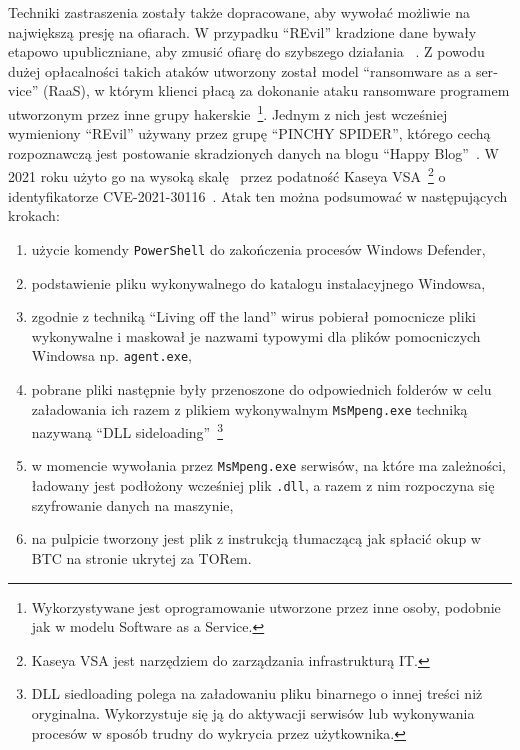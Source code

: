Techniki zastraszenia zostały także dopracowane, aby wywołać możliwie na największą presję na ofiarach. W przypadku \foreignquote{english}{REvil} kradzione dane bywały etapowo upubliczniane, aby zmusić ofiarę do szybszego działania ~\cite{hern_ransomware_2021}.\newline
Z powodu dużej opłacalności takich ataków utworzony został model \foreignquote{english}{ransomware as a service} (RaaS), w którym klienci płacą za dokonanie ataku ransomware programem utworzonym przez inne grupy hakerskie~\footnote{Wykorzystywane jest oprogramowanie utworzone przez inne osoby, podobnie jak w modelu Software as a Service.}. 
\newline
Jednym z nich jest wcześniej wymieniony \foreignquote{english}{REvil} używany przez grupę \foreignquote{english}{PINCHY SPIDER}, którego cechą rozpoznawczą jest postowanie skradzionych danych na blogu \foreignquote{english}{Happy Blog}~\cite{hern_ransomware_2021}. W 2021 roku użyto go na wysoką skalę~\cite{mcmillan_ransomware_2021} przez podatność Kaseya VSA~\footnote{Kaseya VSA jest narzędziem do zarządzania infrastrukturą IT.} o identyfikatorze CVE-2021-30116~\cite{kasaya}. Atak ten można podsumować w następujących krokach:
\begin{enumerate}
    \item użycie komendy \texttt{PowerShell} do zakończenia procesów Windows Defender,
    \item podstawienie pliku wykonywalnego do katalogu instalacyjnego Windowsa,
    \item zgodnie z techniką \foreignquote{english}{Living off the land} wirus pobierał pomocnicze pliki wykonywalne i maskował je nazwami typowymi dla plików pomocniczych Windowsa np. \texttt{agent.exe},
    \item pobrane pliki następnie były przenoszone do odpowiednich folderów w celu załadowania ich razem z plikiem wykonywalnym \texttt{MsMpeng.exe} techniką nazywaną \foreignquote{english}{DLL sideloading}~\footnote{DLL siedloading polega na załadowaniu pliku binarnego o innej treści niż oryginalna. Wykorzystuje się ją do aktywacji serwisów lub wykonywania procesów w sposób trudny do wykrycia przez użytkownika.}
    \item w momencie wywołania przez \texttt{MsMpeng.exe} serwisów, na które ma zależności, ładowany jest podłożony wcześniej plik \texttt{.dll}, a razem z nim rozpoczyna się szyfrowanie danych na maszynie,
    \item na pulpicie tworzony jest plik z instrukcją tłumaczącą jak spłacić okup w BTC na stronie ukrytej za TORem.~\cite{huntresslabs_crticial_2021}
\end{enumerate}
